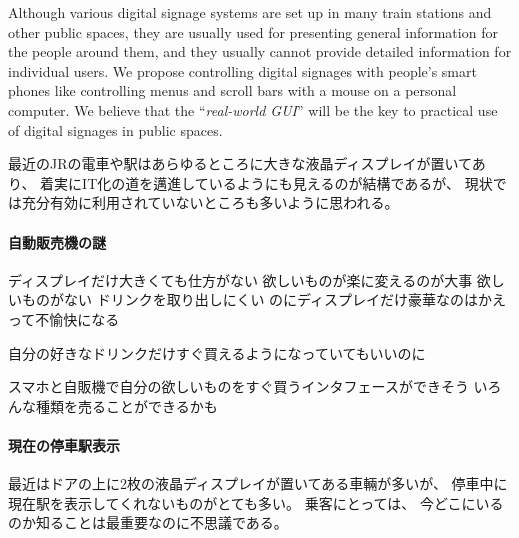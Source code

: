 \documentclass[a4j,11pt,twocolumn]{jarticle}
\makeatletter
\def\jtitle#1{\gdef\@jtitle{#1}}
\def\@jtitle#{\mkt\@warning\jtitle}
\def\etitle#1{\gdef\@etitle{#1}}
\def\@etitle{\mkt@warning\etitle}
\def\jkeywords#1{\gdef\@jkeywords{#1}}
\def\@jkeywords#{\mkt\@warning\jkeywords}
\def\ekeywords#1{\gdef\@ekeywords{#1}}
\def\@ekeywords{\mkt@warning\ekeywords}
\def\SP{スマートフォン}
\makeatother
\begin{document}
\def\figwidth{7.5cm}

\jtitle{JRとディスプレイ}
\jkeywords{実世界インタフェース, 実世界GUI, デジタルサイネージ, {\SP}, RFID}
\ekeywords{real-world GUI, digital signage, smart phones, RFID}
\begin{eabstract}
Although various digital signage systems are set up in many train stations and
other public spaces, they are usually used for presenting general information
for the people around them,
and they usually cannot provide detailed information for individual users.
We propose controlling digital signages with people's smart phones
like controlling menus and scroll bars with a mouse on a personal computer.
We believe that the ``\textit{real-world GUI}'' will be the key to
practical use of digital signages in public spaces.
\end{eabstract}

\etitle{JR and ubiquitous display devices}

\maketitle

最近のJRの電車や駅はあらゆるところに大きな液晶ディスプレイが置いてあり、
着実にIT化の道を邁進しているようにも見えるのが結構であるが、
現状では充分有効に利用されていないところも多いように思われる。

\paragraph{自動販売機の謎}

ディスプレイだけ大きくても仕方がない
欲しいものが楽に変えるのが大事
欲しいものがない
ドリンクを取り出しにくい
のにディスプレイだけ豪華なのはかえって不愉快になる

自分の好きなドリンクだけすぐ買えるようになっていてもいいのに

スマホと自販機で自分の欲しいものをすぐ買うインタフェースができそう
いろんな種類を売ることができるかも


\paragraph{現在の停車駅表示}

最近はドアの上に2枚の液晶ディスプレイが置いてある車輛が多いが、
停車中に現在駅を表示してくれないものがとても多い。
乗客にとっては、
今どこにいるのか知ることは最重要なのに不思議である。
\end{document}
